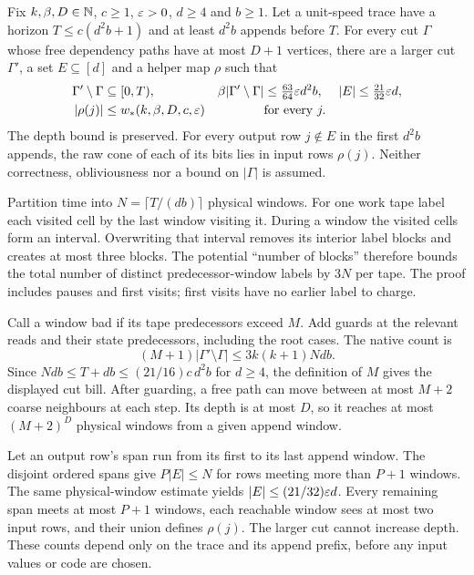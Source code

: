 \begin{theorem}\label{thm:W}
Fix $k,\beta,D\in\mathbb{N}$, $c\ge1$, $\varepsilon>0$, $d\ge4$ and $b\ge1$. Let a unit-speed trace have a horizon
$T\le c(d^2b+1)$ and at least $d^2b$ appends before $T$. For every cut $\Gamma$ whose free dependency paths have at
most $D+1$ vertices, there are a larger cut $\Gamma'$, a set $E\subseteq[d]$ and a helper map $\rho$ such that
\begin{align*}
 \Gamma'\setminus\Gamma&\subseteq[0,T),&
 \beta|\Gamma'\setminus\Gamma|&\le\tfrac{63}{64}\varepsilon d^2b,&
 |E|&\le\tfrac{21}{32}\varepsilon d,\\
 |\rho(j)|&\le w_*(k,\beta,D,c,\varepsilon)&&\text{for every }j.
\end{align*}
The depth bound is preserved. For every output row $j\notin E$ in the first $d^2b$ appends, the raw cone of each
of its bits lies in input rows $\rho(j)$. Neither correctness, obliviousness nor a bound on $|\Gamma|$ is assumed.
\end{theorem}
\begin{outline}
Partition time into $N=\lceil T/(db)\rceil$ physical windows. For one work tape label each visited cell by the last
window visiting it. During a window the visited cells form an interval. Overwriting that interval removes its
interior label blocks and creates at most three blocks. The potential ``number of blocks'' therefore bounds the
total number of distinct predecessor-window labels by $3N$ per tape. The proof includes pauses and first visits;
first visits have no earlier label to charge.

Call a window bad if its tape predecessors exceed $M$. Add guards at the relevant reads and their state
predecessors, including the root cases. The native count is
\[
 (M+1)|\Gamma'\setminus\Gamma|\le3k(k+1)Ndb.
\]
Since $Ndb\le T+db\le(21/16)c\,d^2b$ for $d\ge4$, the definition of $M$ gives the displayed cut bill.
After guarding, a free path can move between at most $M+2$ coarse neighbours at each step. Its depth is at most
$D$, so it reaches at most $(M+2)^D$ physical windows from a given append window.

Let an output row's span run from its first to its last append window. The disjoint ordered spans give
$P|E|\le N$ for rows meeting more than $P+1$ windows. The same physical-window estimate yields
$|E|\le(21/32)\varepsilon d$. Every remaining span meets at most $P+1$ windows, each reachable window sees at most two
input rows, and their union defines $\rho(j)$. The larger cut cannot increase depth. These counts depend only on
the trace and its append prefix, before any input values or code are chosen.
\end{outline}

